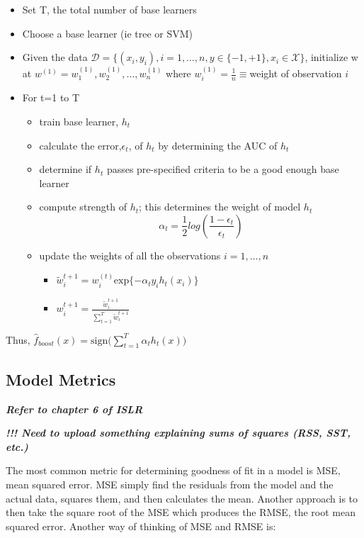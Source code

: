 \documentclass[a4paper]{article}
\begin{document}
    \begin{itemize}
    \item Set T, the total number of base learners
    \item Choose a base learner (ie tree or SVM)
    \item Given the data $\mathcal{D}=\{(x_i,y_i),i=1,\dots,n, y\in \{-1,+1\}, x_i\in\mathcal{X}\}$, initialize w at $w^{(1)}=w_1^{(1)},w_2^{(1)},\dots,w_n^{(1)}$ where $w^{(1)}_i=\frac{1}{n}\equiv $weight of observation $i$
    \item For t=1 to T
    \begin{itemize}
    \item train base learner, $h_t$
    \item calculate the error,$\epsilon_t$, of $h_t$ by determining the AUC of $h_t$
    \item determine if $h_t$ passes pre-specified criteria to be a good enough base learner
    \item compute strength of $h_t$; this determines the weight of model $h_t$  $$\alpha_t=\frac{1}{2}log(\frac{1-\epsilon_t}{\epsilon_t})$$
    \item update the weights of all the observations $i=1,\dots,n$
    \begin{itemize}
    \item $\tilde{w}_i^{t+1}=w_i^{(t)}\text{exp}\{-\alpha_ty_ih_t(x_i)\}$
    \item $w_i^{t+1}=$\Large$\frac{\tilde{w}_i^{t+1}}{\sum_{t=1}^T\tilde{w}_i^{t+1}}$
    \end{itemize}
    \end{itemize}
    \end{itemize}

    Thus, $\hat{f}_{boost}(x)=\text{sign}\Big(\sum_{t=1}^T\alpha_th_t(x)\Big)$

\subsection{Model Metrics}
\textbf{\textit{Refer to chapter 6 of ISLR}}

\textbf{\textit{!!! Need to upload something explaining sums of squares (RSS, SST, etc.)}}

The most common metric for determining goodness of fit in a model is MSE, mean squared error. MSE simply find the residuals from the model and the actual data, squares them, and then calculates the mean. Another approach is to then take the square root of the MSE which produces the RMSE, the root mean squared error. Another way of thinking of MSE and RMSE is:
\end{document}
